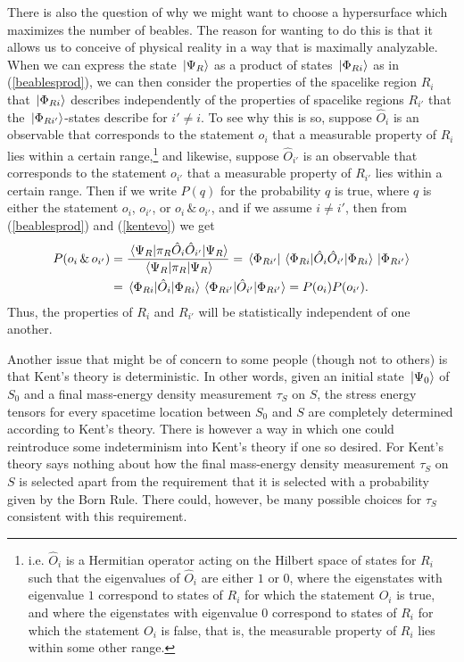 There is also the question of why we might want to choose a hypersurface which maximizes the number of beables. The reason for wanting to do this is that it allows us to conceive of physical reality in a way that is maximally analyzable. When we can express the state $\ket*{\Psi_R}$ as a product of states $\ket*{\Phi_{Ri}}$ as in (\ref{beablesprod}),  we can then consider the properties of the spacelike region $R_i$ that $\ket*{\Phi_{Ri}}$ describes independently of the properties of  spacelike regions $R_{i'}$ that the $\ket*{\Phi_{Ri'}}$-states describe for $i'\neq i$. To see why this is so, suppose $\hat{O}_i$ is an observable that corresponds to the statement $o_i$ that a measurable property of $R_{i}$ lies within a certain range,\footnote{i.e. $\hat{O}_i$ is a Hermitian operator acting on the Hilbert space of states for $R_i$ such that the eigenvalues of $\hat{O}_i$ are either $1$ or $0$, where the eigenstates with eigenvalue $1$ correspond to states of $R_i$ for which the statement $O_i$ is true, and  where the eigenstates with eigenvalue $0$ correspond to states of $R_i$ for which the statement $O_i$ is false, that is, the measurable property of $R_i$ lies within some other range.} and likewise, suppose $\hat{O}_{i'}$ is an observable that corresponds to the statement $o_{i'}$ that a measurable property of $R_{i'}$ lies within a certain range. Then if we write $P(q)$ for the probability $q$ is true, where $q$ is either the statement $o_i$, $o_{i'}$, or $o_i\, \&\, o_{i'}$, and if we assume $i\neq i'$, then from (\ref{beablesprod}) and (\ref{kentevo}) we get
\begin{equation}
\begin{split}
P(o_i\, \&\, o_{i'})&=\frac{\ev*{\pi_R\hat{O}_i\hat{O}_{i'}}{\Psi_R}}{\ev*{\pi_R}{\Psi_R}}=\bra*{\Phi_{Ri'}}\ev*{\hat{O}_i\hat{O}_{i'}}{\Phi_{Ri}}\ket*{\Phi_{Ri'}}\\
&=\ev*{\hat{O}_i}{\Phi_{Ri}}\ev*{\hat{O}_{i'}}{\Phi_{Ri'}}=P(o_i)P(o_{i'}).
\end{split}
\end{equation}
Thus, the properties of $R_i$ and $R_{i'}$ will be statistically independent of one another.


Another issue that might be of concern to some people (though not to others) is that Kent's theory is deterministic. In other words, given an initial state $\ket*{\Psi_0}$ of $S_0$ and a final mass-energy density measurement $\tau_S$ on $S$, the stress energy tensors for every spacetime location between $S_0$ and $S$ are completely determined according to Kent's theory. There is however a way in which one could reintroduce some indeterminism into Kent's theory if one so desired. For Kent's theory says nothing about how the final mass-energy density measurement $\tau_S$ on $S$ is selected apart from the requirement that it is selected with a probability given by the Born Rule. There could, however, be many possible choices for $\tau_S$ consistent with this requirement. 


